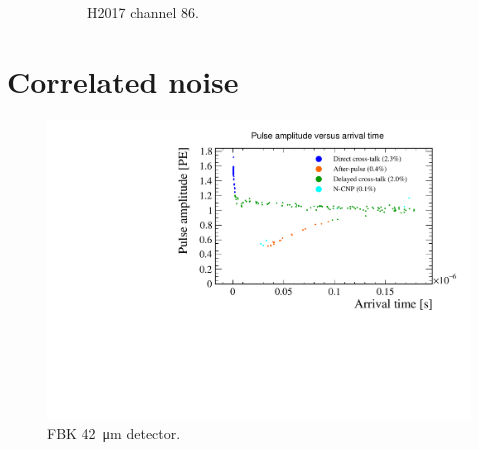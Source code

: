 \begin{figure}
\begin{subfigure}{0.48\textwidth}
    \caption{H2017 channel $86$.}
  \end{subfigure}
\caption{}
\label{appendix:fig:Vbd fits}
\end{figure}


\section{Correlated noise}

\begin{figure}[hbtp]
    \centering
    \includegraphics[width=1\textwidth]{gfx/plots/WA/42/peakamptime.pdf}
    \caption{FBK \SI{42}{\micro m} detector.}   
    \label{fig:peakamptime 42}
\end{figure}


